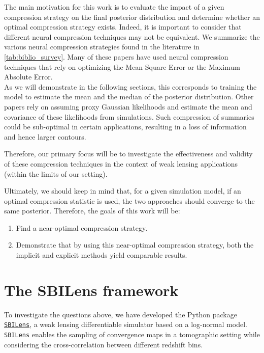 \documentclass{aa}
\begin{document}
The main motivation for this work is to evaluate the impact of a given compression strategy on the final posterior distribution and determine whether an optimal compression strategy exists. Indeed, it is important to consider that different neural compression techniques may not be equivalent. We summarize the various neural compression strategies found in the literature in \autoref{tab:biblio_survey}. 
Many of these papers have used neural compression techniques that rely on optimizing the Mean Square Error or the Maximum Absolute Error. \\
As we will demonstrate in the following sections, this corresponds to training the model to estimate the mean and the median of the posterior distribution. Other papers rely on assuming proxy Gaussian likelihoods and estimate the mean and covariance of these likelihoods from simulations.
Such compression of summaries could be sub-optimal in certain applications, resulting in a loss of information and hence larger contours. 

Therefore, our primary focus will be to investigate the effectiveness and validity of these compression techniques in the context of weak lensing applications (within the limits of our setting).

\vspace{1cm}
Ultimately, we should keep in mind that, for a given simulation model, if an optimal compression statistic is used, the two approaches should converge to the same posterior. Therefore, the goals of this work will be:
\begin{enumerate}
    \item Find a near-optimal compression strategy.
    \item Demonstrate that by using this near-optimal compression strategy, both the implicit and explicit methods yield comparable results.
\end{enumerate}


\section{The SBILens framework}\label{Sec:the SBILens framework}
To investigate the questions above, we have developed the Python package \href{https://github.com/DifferentiableUniverseInitiative/sbi_lens}{\texttt{SBILens}}, a weak lensing differentiable simulator based on a log-normal model. \texttt{SBILens} enables the sampling of convergence maps in a tomographic setting while considering the cross-correlation between different redshift bins.
\end{document}
